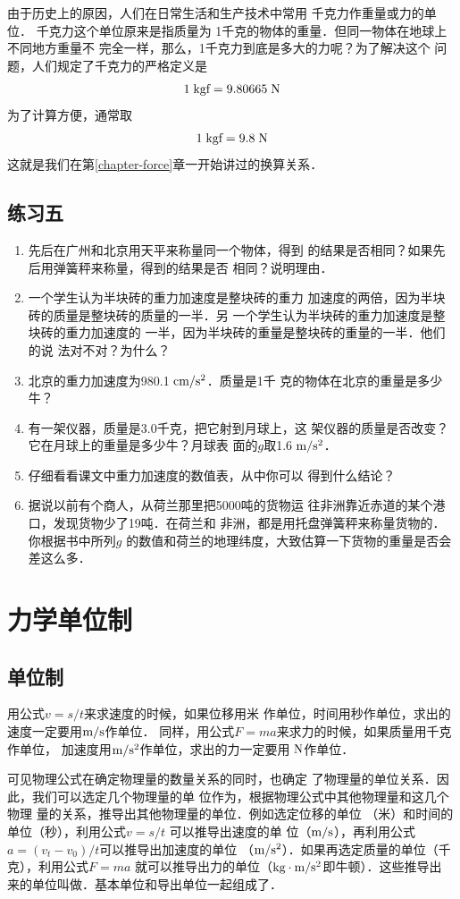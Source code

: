 由于历史上的原因，人们在日常生活和生产技术中常用
千克力作重量或力的单位．
千克力这个单位原来是指质量为
1千克的物体的重量．但同一物体在地球上不同地方重量不
完全一样，那么，1千克力到底是多大的力呢？为了解决这个
问题，人们规定了千克力的严格定义是
                  \[1 \;\text{kgf}=9.80665\;\text{N}\]
为了计算方便，通常取
                    \[1 \;\text{kgf} =9.8 \;\text{N}\]
这就是我们在第\ref{chapter-force}章一开始讲过的换算关系．

\subsection*{练习五}
\begin{enumerate}
\item 先后在广州和北京用天平来称量同一个物体，得到
的结果是否相同？如果先后用弹簧秤来称量，得到的结果是否
相同？说明理由．
\item 一个学生认为半块砖的重力加速度是整块砖的重力
加速度的两倍，因为半块砖的质量是整块砖的质量的一半．另
一个学生认为半块砖的重力加速度是整块砖的重力加速度的
一半，因为半块砖的重量是整块砖的重量的一半．他们的说
法对不对？为什么？
\item 北京的重力加速度为980.1$ \;\text{cm}/\text{s}^2 $．质量是1千
克的物体在北京的重量是多少牛？
\item 有一架仪器，质量是3.0千克，把它射到月球上，这
架仪器的质量是否改变？它在月球上的重量是多少牛？月球表
面的$g$取1.6$\;\text{m}/\text{s}^2$．
\item 仔细看看课文中重力加速度的数值表，从中你可以
得到什么结论？
\item 据说以前有个商人，从荷兰那里把5000吨的货物运
往非洲靠近赤道的某个港口，发现货物少了19吨．在荷兰和
非洲，都是用托盘弹簧秤来称量货物的．你根据书中所列$g$
的数值和荷兰的地理纬度，大致估算一下货物的重量是否会
差这么多．
\end{enumerate}

\section{力学单位制}
\subsection{单位制}
用公式$v=s/t$来求速度的时候，如果位移用米
作单位，时间用秒作单位，求出的速度一定要用$\text{m}/\text{s}$作单位．
同样，用公式$F=ma$来求力的时候，如果质量用千克作单位，
加速度用$\text{m}/\text{s}^2$作单位，求出的力一定要用$\;\text{N}$作单位．

可见物理公式在确定物理量的数量关系的同时，也确定
了物理量的单位关系．因此，我们可以选定几个物理量的单
位作为，根据物理公式中其他物理量和这几个物理
量的关系，推导出其他物理量的单位．例如选定位移的单位
（米）和时间的单位（秒），利用公式$v=s/t$
可以推导出速度的单
位（$\text{m}/\text{s}$），再利用公式$a=(v_t-v_0)/t$可以推导出加速度的单位
（$\text{m}/\text{s}^2$）．如果再选定质量的单位（千克），利用公式$F=ma$
就可以推导出力的单位（$\text{kg}\cdot \text{m}/\text{s}^2$即牛顿）．这些推导出
来的单位叫做．基本单位和导出单位一起组成了．

